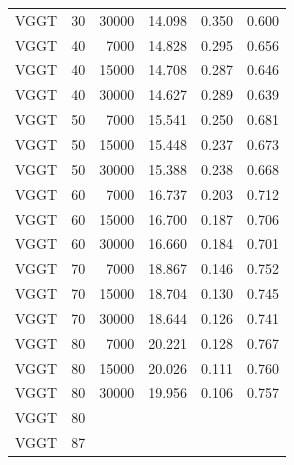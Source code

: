 \begin{table}[H]
\begin{tabular}{lrrrrr}
VGGT & 30 & 30000 & 14.098 & 0.350 & 0.600 \\
VGGT & 40 & 7000 & 14.828 & 0.295 & 0.656 \\
VGGT & 40 & 15000 & 14.708 & 0.287 & 0.646 \\
VGGT & 40 & 30000 & 14.627 & 0.289 & 0.639 \\
VGGT & 50 & 7000 & 15.541 & 0.250 & 0.681 \\
VGGT & 50 & 15000 & 15.448 & 0.237 & 0.673 \\
VGGT & 50 & 30000 & 15.388 & 0.238 & 0.668 \\
VGGT & 60 & 7000 & 16.737 & 0.203 & 0.712 \\
VGGT & 60 & 15000 & 16.700 & 0.187 & 0.706 \\
VGGT & 60 & 30000 & 16.660 & 0.184 & 0.701 \\
VGGT & 70 & 7000 & 18.867 & 0.146 & 0.752 \\
VGGT & 70 & 15000 & 18.704 & 0.130 & 0.745 \\
VGGT & 70 & 30000 & 18.644 & 0.126 & 0.741 \\
VGGT & 80 & 7000 & 20.221 & 0.128 & 0.767 \\
VGGT & 80 & 15000 & 20.026 & 0.111 & 0.760 \\
VGGT & 80 & 30000 & 19.956 & 0.106 & 0.757 \\
VGGT & 80 &  &  &  &  \\
VGGT & 87 &  &  &  &  \\
\bottomrule
\end{tabular}
\end{table}
